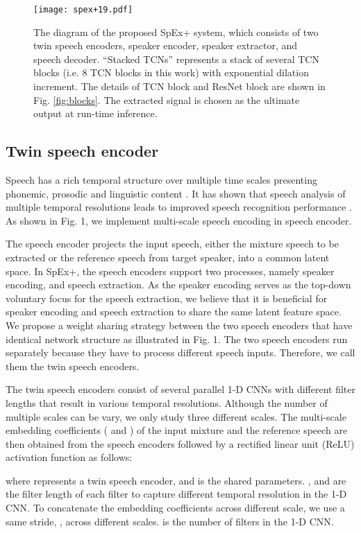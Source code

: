 \documentclass[a4paper]{article}
\begin{document}
\begin{figure}[t]
	\centering
	\texttt{[image: spex+19.pdf]}
	\caption{The diagram of the proposed SpEx+ system, which consists of two twin speech encoders, speaker encoder, speaker extractor, and speech decoder. ``Stacked TCNs'' represents a stack of several TCN blocks (i.e. 8 TCN blocks in this work) with exponential dilation increment. The details of TCN block and ResNet block are shown in Fig. \ref{fig:blocks}. The extracted signal  is chosen as the ultimate output at run-time inference.}
	\label{fig:speech_production}
\end{figure}

\subsection{Twin speech encoder}
Speech has a rich temporal structure over multiple time scales presenting phonemic, prosodic and linguistic content \cite{toledano2018multi}. It has shown that speech analysis of multiple temporal resolutions leads to improved speech recognition performance \cite{teng2016testing}. As shown in Fig. 1, we implement multi-scale speech encoding in speech encoder.

The speech encoder projects the input speech, either the mixture speech  to be extracted or the reference speech  from target speaker, into a common latent space. In SpEx+, the speech encoders support two processes, namely speaker encoding, and speech extraction. As the speaker encoding serves as the top-down voluntary focus for the speech extraction, we believe that it is beneficial for speaker encoding and speech extraction to share the same latent feature space. We propose a weight sharing strategy between the two speech encoders that have identical network structure as illustrated in Fig. 1. The two speech encoders run separately because they have to process different speech inputs. Therefore, we call them the twin speech encoders.

The twin speech encoders consist of several parallel 1-D CNNs with different filter lengths that result in various temporal resolutions. Although the number of multiple scales can be vary, we only study three different scales. The multi-scale embedding coefficients ( and ) of the input mixture and the reference speech are then obtained from the speech encoders followed by a rectified linear unit (ReLU) activation function as follows:

where  represents a twin speech encoder, and  is the shared parameters. ,  and  are the filter length of each filter to capture different temporal resolution in the 1-D CNN. To concatenate the embedding coefficients across different scale,
we use a same stride, , across different scales.  is the number of filters in the 1-D CNN.
\end{document}
